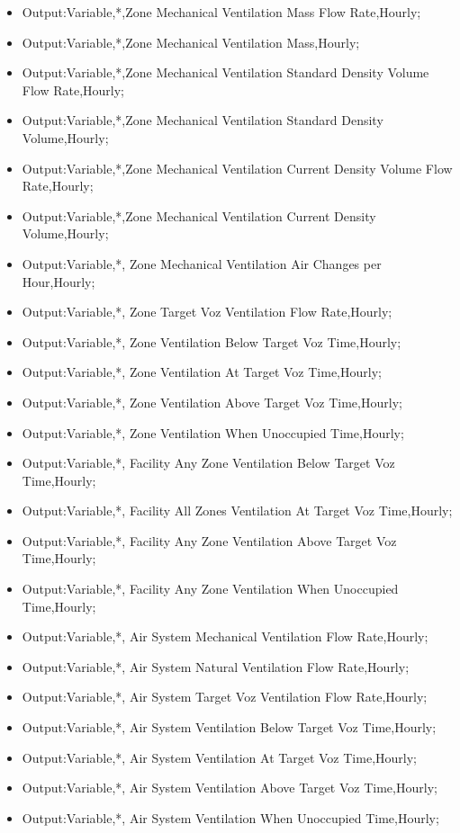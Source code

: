 \begin{itemize}
\item
  Output:Variable,*,Zone Mechanical Ventilation Mass Flow Rate,Hourly;
\item
  Output:Variable,*,Zone Mechanical Ventilation Mass,Hourly;
\item
  Output:Variable,*,Zone Mechanical Ventilation Standard Density Volume Flow Rate,Hourly;
\item
  Output:Variable,*,Zone Mechanical Ventilation Standard Density Volume,Hourly;
\item
  Output:Variable,*,Zone Mechanical Ventilation Current Density Volume Flow Rate,Hourly;
\item
  Output:Variable,*,Zone Mechanical Ventilation Current Density Volume,Hourly;
\item
  Output:Variable,*, Zone Mechanical Ventilation Air Changes per Hour,Hourly;
\item
  Output:Variable,*, Zone Target Voz Ventilation Flow Rate,Hourly;
\item
  Output:Variable,*, Zone Ventilation Below Target Voz Time,Hourly;
\item
  Output:Variable,*, Zone Ventilation At Target Voz Time,Hourly;
\item
  Output:Variable,*, Zone Ventilation Above Target Voz Time,Hourly;
\item
  Output:Variable,*, Zone Ventilation When Unoccupied Time,Hourly;
\item
  Output:Variable,*, Facility Any Zone Ventilation Below Target Voz Time,Hourly;
\item
  Output:Variable,*, Facility All Zones Ventilation At Target Voz Time,Hourly;
\item
  Output:Variable,*, Facility Any Zone Ventilation Above Target Voz Time,Hourly;
\item
  Output:Variable,*, Facility Any Zone Ventilation When Unoccupied Time,Hourly;
\item
  Output:Variable,*, Air System Mechanical Ventilation Flow Rate,Hourly;
\item
  Output:Variable,*, Air System Natural Ventilation Flow Rate,Hourly;
\item
  Output:Variable,*, Air System Target Voz Ventilation Flow Rate,Hourly;
\item
  Output:Variable,*, Air System Ventilation Below Target Voz Time,Hourly;
\item
  Output:Variable,*, Air System Ventilation At Target Voz Time,Hourly;
\item
  Output:Variable,*, Air System Ventilation Above Target Voz Time,Hourly;
\item
  Output:Variable,*, Air System Ventilation When Unoccupied Time,Hourly;
\end{itemize}

